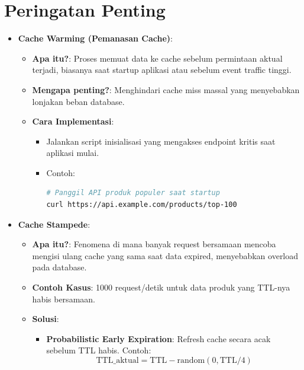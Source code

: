 \documentclass[11pt, a4paper]{book}
\begin{document}
	
	\section{Peringatan Penting}
	\label{sec:peringatan}
	
	\begin{itemize}
		\item \textbf{Cache Warming (Pemanasan Cache)}:  
		\begin{itemize}
			\item \textbf{Apa itu?}:  
			Proses memuat data ke cache sebelum permintaan aktual terjadi, biasanya saat startup aplikasi atau sebelum event traffic tinggi.
			
			\item \textbf{Mengapa penting?}:  
			Menghindari cache miss massal yang menyebabkan lonjakan beban database.
			
			\item \textbf{Cara Implementasi}:
			\begin{itemize}
				\item Jalankan script inisialisasi yang mengakses endpoint kritis saat aplikasi mulai.
				\item Contoh:  
				\begin{lstlisting}[language=bash,caption=Contoh Script Cache Warming]
# Panggil API produk populer saat startup
curl https://api.example.com/products/top-100
            \end{lstlisting}
			\end{itemize}
		\end{itemize}
		
		\item \textbf{Cache Stampede}:  
		\begin{itemize}
			\item \textbf{Apa itu?}:  
			Fenomena di mana banyak request bersamaan mencoba mengisi ulang cache yang sama saat data expired, menyebabkan overload pada database.
			
			\item \textbf{Contoh Kasus}:  
			1000 request/detik untuk data produk yang TTL-nya habis bersamaan.
			
			\item \textbf{Solusi}:
			\begin{itemize}
				\item \textbf{Probabilistic Early Expiration}:  
				Refresh cache secara acak sebelum TTL habis. Contoh:  
				\[
				\mathrm{TTL\_aktual} = \mathrm{TTL} - \mathrm{random}(0, \mathrm{TTL}/4)
				\]
				

\end{itemize}
\end{itemize}
\end{itemize}
\end{document}
